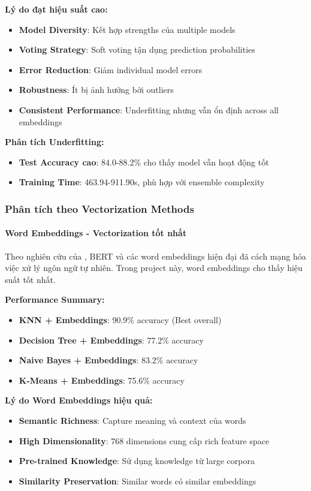 \textbf{Lý do đạt hiệu suất cao:}
\begin{itemize}
    \item \textbf{Model Diversity}: Kết hợp strengths của multiple models
    \item \textbf{Voting Strategy}: Soft voting tận dụng prediction probabilities
    \item \textbf{Error Reduction}: Giảm individual model errors
    \item \textbf{Robustness}: Ít bị ảnh hưởng bởi outliers
    \item \textbf{Consistent Performance}: Underfitting nhưng vẫn ổn định across all embeddings
\end{itemize}

\textbf{Phân tích Underfitting:}
\begin{itemize}
    \item \textbf{Test Accuracy cao}: 84.0-88.2\% cho thấy model vẫn hoạt động tốt
    \item \textbf{Training Time}: 463.94-911.90s, phù hợp với ensemble complexity
\end{itemize}

\subsubsection{Phân tích theo Vectorization Methods}

\paragraph{Word Embeddings - Vectorization tốt nhất}

Theo nghiên cứu của \cite{devlin2018}, BERT và các word embeddings hiện đại đã cách mạng hóa việc xử lý ngôn ngữ tự nhiên. Trong project này, word embeddings cho thấy hiệu suất tốt nhất.

\textbf{Performance Summary:}
\begin{itemize}
    \item \textbf{KNN + Embeddings}: 90.9\% accuracy (Best overall)
    \item \textbf{Decision Tree + Embeddings}: 77.2\% accuracy
    \item \textbf{Naive Bayes + Embeddings}: 83.2\% accuracy
    \item \textbf{K-Means + Embeddings}: 75.6\% accuracy
\end{itemize}

\textbf{Lý do Word Embeddings hiệu quả:}
\begin{itemize}
    \item \textbf{Semantic Richness}: Capture meaning và context của words
    \item \textbf{High Dimensionality}: 768 dimensions cung cấp rich feature space
    \item \textbf{Pre-trained Knowledge}: Sử dụng knowledge từ large corpora
    \item \textbf{Similarity Preservation}: Similar words có similar embeddings
\end{itemize}

